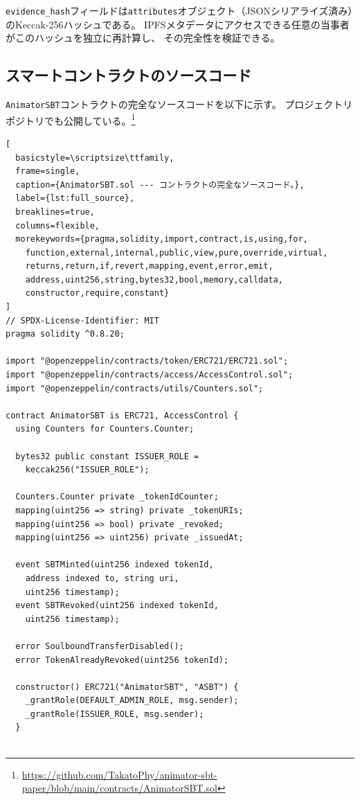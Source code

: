 \texttt{evidence\_hash}フィールドは\texttt{attributes}オブジェクト（JSONシリアライズ済み）のKeccak-256ハッシュである。
IPFSメタデータにアクセスできる任意の当事者がこのハッシュを独立に再計算し、
その完全性を検証できる。

\subsection{スマートコントラクトのソースコード}
\label{app:source}

\texttt{AnimatorSBT}コントラクトの完全なソースコードを以下に示す。
プロジェクトリポジトリでも公開している。\footnote{%
\url{https://github.com/TakatoPhy/animator-sbt-paper/blob/main/contracts/AnimatorSBT.sol}}

\begin{lstlisting}[
  basicstyle=\scriptsize\ttfamily,
  frame=single,
  caption={AnimatorSBT.sol --- コントラクトの完全なソースコード。},
  label={lst:full_source},
  breaklines=true,
  columns=flexible,
  morekeywords={pragma,solidity,import,contract,is,using,for,
    function,external,internal,public,view,pure,override,virtual,
    returns,return,if,revert,mapping,event,error,emit,
    address,uint256,string,bytes32,bool,memory,calldata,
    constructor,require,constant}
]
// SPDX-License-Identifier: MIT
pragma solidity ^0.8.20;

import "@openzeppelin/contracts/token/ERC721/ERC721.sol";
import "@openzeppelin/contracts/access/AccessControl.sol";
import "@openzeppelin/contracts/utils/Counters.sol";

contract AnimatorSBT is ERC721, AccessControl {
  using Counters for Counters.Counter;

  bytes32 public constant ISSUER_ROLE =
    keccak256("ISSUER_ROLE");

  Counters.Counter private _tokenIdCounter;
  mapping(uint256 => string) private _tokenURIs;
  mapping(uint256 => bool) private _revoked;
  mapping(uint256 => uint256) private _issuedAt;

  event SBTMinted(uint256 indexed tokenId,
    address indexed to, string uri,
    uint256 timestamp);
  event SBTRevoked(uint256 indexed tokenId,
    uint256 timestamp);

  error SoulboundTransferDisabled();
  error TokenAlreadyRevoked(uint256 tokenId);

  constructor() ERC721("AnimatorSBT", "ASBT") {
    _grantRole(DEFAULT_ADMIN_ROLE, msg.sender);
    _grantRole(ISSUER_ROLE, msg.sender);
  }


\end{lstlisting}
